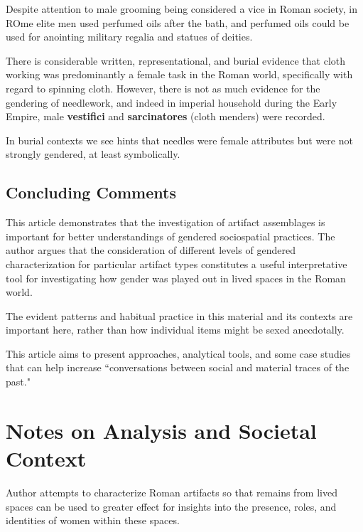\begin{rmk}
    Despite attention to male grooming being considered a vice in Roman society, in ROme elite men used perfumed oils after the bath, and perfumed oils could be used for anointing military regalia and statues of deities.
\end{rmk}

There is considerable written, representational, and burial evidence that cloth working was predominantly a female task in the Roman world, specifically with regard to spinning cloth. However, there is not as much evidence for the gendering of needlework, and indeed in imperial household during the Early Empire, male \textbf{vestifici} and \textbf{sarcinatores} (cloth menders) were recorded.


In burial contexts we see hints that needles were female attributes but were not strongly gendered, at least symbolically. 

\subsection{Concluding Comments}

This article demonstrates that the investigation of artifact assemblages is important for better understandings of gendered sociospatial practices. The author argues that the consideration of different levels of gendered characterization for particular artifact types constitutes a useful interpretative tool for investigating how gender was played out in lived spaces in the Roman world.

The evident patterns and habitual practice in this material and its contexts are important here, rather than how individual items might be sexed anecdotally. 

\begin{rmk}
    This article aims to present approaches, analytical tools, and some case studies that can help increase ``conversations between social and material traces of the past."
\end{rmk}





\section{Notes on Analysis and Societal Context}
\label{sec:SocCont14}


Author attempts to characterize Roman artifacts so that remains from lived spaces can be used to greater effect for insights into the presence, roles, and identities of women within these spaces.

